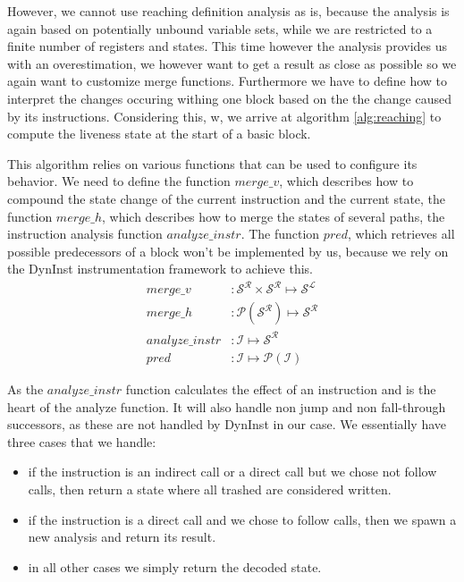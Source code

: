 However, we cannot use reaching definition analysis as is, because the analysis is again based on potentially unbound 
variable sets, while we are restricted to a finite number of registers and states. This time however the analysis provides us with an overestimation, 
we however want to get a result as close as possible so we again want to customize merge functions. Furthermore we have to define how 
to interpret the changes occuring withing one block based on the the change caused by its instructions. Considering this, w, we 
arrive at algorithm \ref{alg:reaching} to compute the liveness state at the start of a basic block.

This algorithm relies on various functions that can be used to configure its behavior. We need to define the 
function $merge\_v$, which describes how to compound the state change of the current instruction and the current state, 
the function $merge\_h$, which describes how to merge the states of several paths, the instruction analysis function
$analyze\_instr$. The function $pred$, which retrieves all possible predecessors of a block won't be implemented by us, 
because we rely on the DynInst instrumentation framework to achieve this.
\begin{subequations}
\label{eq:livenesscustom}
\begin{align}
merge\_v &: \mathcal{S}^\mathcal{R} \times \mathcal{S}^\mathcal{R} \mapsto \mathcal{S}^\mathcal{L}\\
merge\_h &: \mathcal{P}(\mathcal{S}^\mathcal{R}) \mapsto \mathcal{S}^\mathcal{R}\\
analyze\_instr &: \mathcal {I} \mapsto \mathcal{S}^\mathcal{R} \\
pred &: \mathcal{I} \mapsto \mathcal{P}(\mathcal{I})
\end{align}
\end{subequations}

As the $analyze\_instr$ function calculates the effect of an instruction and is the heart of the analyze function. It will also 
handle non jump and non fall-through successors, as these are not handled by DynInst in our case. We essentially have three cases that we handle:
\begin{itemize}
\item if the instruction is an indirect call or a direct call but we chose not follow calls, then return a state where all trashed 
are considered written.
\item if the instruction is a direct call and we chose to follow calls, then we spawn a new analysis and return its result.
\item in all other cases we simply return the decoded state.
\end{itemize}

